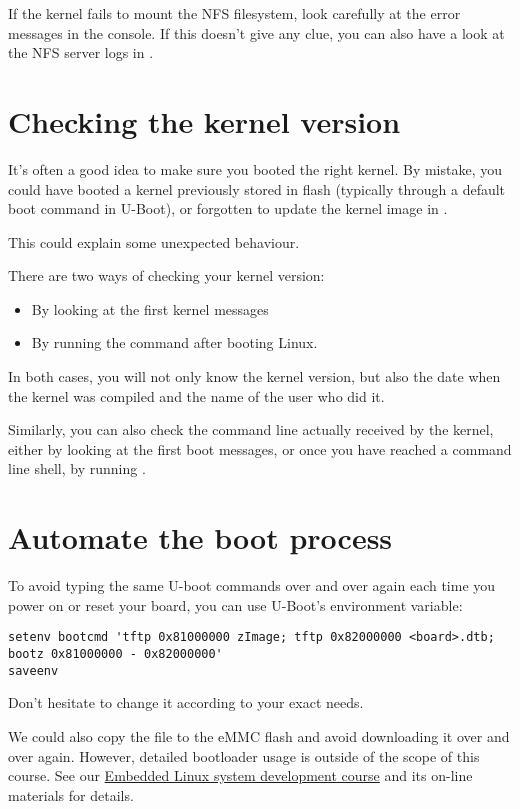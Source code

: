 If the kernel fails to mount the NFS filesystem, look carefully at the
error messages in the console. If this doesn't give any clue, you can
also have a look at the NFS server logs in .

\section{Checking the kernel version}

It's often a good idea to make sure you booted the right kernel.
By mistake, you could have booted a kernel previously stored in flash
(typically through a default boot command in U-Boot), or forgotten to 
update the kernel image in .

This could explain some unexpected behaviour.

There are two ways of checking your kernel version:
\begin{itemize}
\item By looking at the first kernel messages
\item By running the  command after booting Linux. 
\end{itemize}

In both cases, you will not only know the kernel version, but also
the date when the kernel was compiled and the name of the user who
did it.

Similarly, you can also check the command line actually received by
the kernel, either by looking at the first boot messages, or once you
have reached a command line shell, by running .

\section{Automate the boot process}

To avoid typing the same U-boot commands over and over again each time
you power on or reset your board, you can use U-Boot's 
environment variable:

{\scriptsize
\begin{verbatim}
setenv bootcmd 'tftp 0x81000000 zImage; tftp 0x82000000 <board>.dtb; bootz 0x81000000 - 0x82000000'
saveenv
\end{verbatim}
}

Don't hesitate to change it according to your exact needs.

We could also copy the  file to the eMMC flash and avoid
downloading it over and over again. However, detailed bootloader
usage is outside of the scope of this course. See our
\href{http://bootlin.com/training/embedded-linux/}{Embedded
Linux system development course} and its on-line materials for
details.
